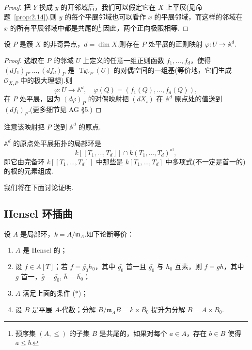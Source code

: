 \begin{proof}
把 $Y$ 换成 $y$ 的开邻域后，我们可以假定它在 $X$ 上平展(见命题~\ref{prop:2.14}).则 $y$ 的每个平展邻域也可以看作 $x$ 的平展邻域，而这样的邻域在 $x$ 的所有平展邻域中都是共尾的\footnote{预序集 $(A, \leq)$ 的子集 $B$ 是共尾的，如果对每个 $a \in A$，存在 $b \in B$ 使得 $a \leq b$.}.因此，两个正向极限相等.
\end{proof}

\begin{proposition}\label{prop:4.9}
设 $P$ 是簇 $X$ 的非奇异点，$d = \dim X$.则存在 $P$ 处平展的正则映射 $\varphi \colon U \to \mathbb{A}^{d}$.
\end{proposition}

\begin{proof}
选取在 $P$ 的邻域 $U$ 上定义的任意一组正则函数 $f_1, \ldots, f_d$，使得 $(df_1)_{P}, \ldots, (df_d)_{P}$ 是 $\operatorname{Tgt}_{P}(U)$ 的对偶空间的一组基(等价地，它们生成 $\mathcal{O}_{X, P}$ 中的极大理想).则
\[
\varphi \colon U \to \mathbb{A}^{d}, \quad \varphi(Q) = (f_1(Q), \ldots, f_d(Q)),
\]
在 $P$ 处平展，因为 $(d\varphi)_{P}$ 的对偶映射把 $(dX_i)$ 在 $\mathbb{A}^{d}$ 原点处的值送到 $(df_i)_{P}$.(更多细节见 AG \S 5.)
\end{proof}

注意该映射把 $P$ 送到 $\mathbb{A}^{d}$ 的原点.

\begin{proposition}\label{prop:4.10}
$\mathbb{A}^{d}$ 的原点处平展拓扑的局部环是
\[
k[[T_1, \ldots, T_d]] \cap k(T_1, \ldots, T_d)^{\mathrm{al}},
\]
即它由完备环 $k[[T_1, \ldots, T_d]]$ 中那些是 $k[T_1, \ldots, T_d]$ 中多项式(不一定是首一的)的根的元素组成.
\end{proposition}

我们将在下面讨论证明.

\subsection*{Hensel 环插曲}

\begin{proposition}\label{prop:4.11}
设 $A$ 是局部环，$k = A/\mathfrak{m}_{A}$.如下论断等价：
\begin{enumerate}
  \item $A$ 是 Hensel 的；
  \item 设 $f \in A[T]$；若 $\bar{f} = \bar{g_0}\bar{h_0}$，其中 $\bar{g_0}$ 首一且 $\bar{g_0}$ 与 $\bar{h_0}$ 互素，则 $f = gh$，其中 $g$ 首一，$\bar{g} = \bar{g_0}$, $\bar{h} = \bar{h_0}$；
  \item $A$ 满足上面的条件 ($\ast$)；
  \item 设 $B$ 是平展 $A$-代数；分解 $B/\mathfrak{m}_{A}B = k \times \bar{B_0}$ 提升为分解 $B = A \times B_0$.
\end{enumerate}
\end{proposition}

